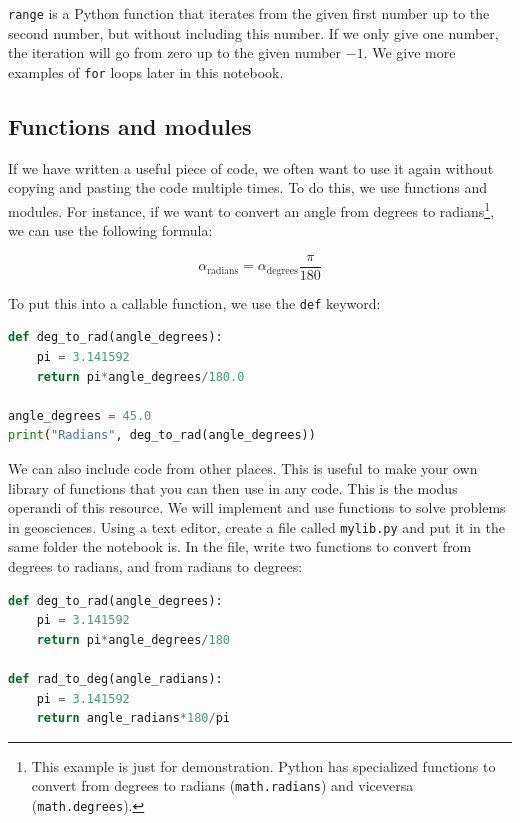 \documentclass[a4paper , 12pt]{book}
\newcommand{\code}[1]{\colorbox{light-gray}{\texttt{#1}}}
\begin{document}
\code{range} is a Python function that iterates from the given first number up to the second number, but without including this number. If we only give one number, the iteration will go from zero up to the given number $-1$. We give more examples of \code{for} loops later in this notebook.

\subsection{Functions and modules}

If we have written a useful piece of code, we often want to use it again without copying and pasting the code multiple times. To do this, we use functions and modules. For instance, if we want to convert an angle from degrees to radians\footnote{This example is just for demonstration. Python has specialized functions to convert from degrees to radians (\code{math.radians}) and viceversa (\code{math.degrees}).}, we can use the following formula: 

\begin{equation}
    \alpha_\text{radians} = \alpha_\text{degrees}\frac{\pi}{180}
\end{equation}    

To put this into a callable function, we use the \code{def} keyword:

\begin{center}
\begin {lstlisting}[language=Python, frame=single]
def deg_to_rad(angle_degrees):
    pi = 3.141592
    return pi*angle_degrees/180.0

angle_degrees = 45.0
print("Radians", deg_to_rad(angle_degrees))
\end{lstlisting}
\end{center}

We can also include code from other places. This is useful to make your own library of functions that you can then use in any code. This is the modus operandi of this resource. We will implement and use functions to solve problems in geosciences. Using a text editor, create a file called \code{mylib.py} and put it in the same folder the notebook is. In the file, write two functions to convert from degrees to radians, and from radians to degrees:

\begin{center}
\begin{lstlisting}[language=Python, frame=single]
def deg_to_rad(angle_degrees):
    pi = 3.141592
    return pi*angle_degrees/180

def rad_to_deg(angle_radians):
    pi = 3.141592
    return angle_radians*180/pi
\end{lstlisting}
\end{center}
\end{document}
